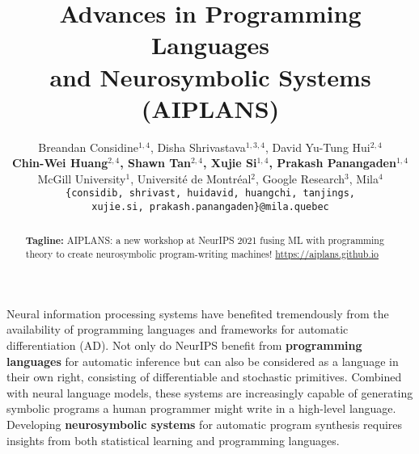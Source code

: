 \documentclass{article}
\title{Advances in Programming Languages\\ and Neurosymbolic Systems (AIPLANS)}
\author{%
    Breandan Considine$^{1, 4}$, Disha Shrivastava$^{1, 3, 4}$, David Yu-Tung Hui$^{2, 4}$ \\
    \textbf{Chin-Wei Huang$^{2, 4}$, Shawn Tan$^{2, 4}$, Xujie Si$^{1, 4}$, Prakash Panangaden$^{1, 4}$} \\
    McGill University$^1$, Universit\'e de Montr\'eal$^2$, Google Research$^3$, Mila$^4$ \\
    \texttt{\{considib, shrivast, huidavid, huangchi, tanjings,}\\
    \texttt{xujie.si, prakash.panangaden\}@mila.quebec} \\
}
\begin{document}
    \maketitle
    \vspace{-0.5cm}
    \begin{abstract}
        \textbf{Tagline:} AIPLANS: a new workshop at NeurIPS 2021 fusing ML with programming theory to create neurosymbolic program-writing machines!  \url{https://aiplans.github.io} %
    \end{abstract}


    Neural information processing systems have benefited tremendously from the availability of programming languages and frameworks for automatic differentiation (AD). Not only do NeurIPS benefit from \textbf{programming languages} for automatic inference but can also be considered as a language in their own right, consisting of differentiable and stochastic primitives. Combined with neural language models, these systems are increasingly capable of generating symbolic programs a human programmer might write in a high-level language. Developing \textbf{neurosymbolic systems} for automatic program synthesis requires insights from both statistical learning and programming languages.
\end{document}
